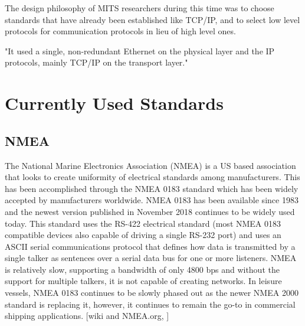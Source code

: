 \documentclass{report}
\begin{document}
The design philosophy of MITS researchers during this time was to choose standards that have already been established like TCP/IP, and to select low level protocols for communication protocols in lieu of high level ones. 

"It used a single, non-redundant Ethernet on the physical layer and the IP protocols, mainly TCP/IP on the transport layer."

\chapter{Currently Used Standards}
\section{NMEA}
The National Marine Electronics Association (NMEA) is a US based association that looks to create uniformity of electrical standards among manufacturers. This has been accomplished through the NMEA 0183 standard which has been widely accepted by manufacturers worldwide. NMEA 0183 has been available since 1983 and the newest version published in November 2018 continues to be widely used today. This standard uses the RS-422 electrical standard (most NMEA 0183 compatible devices also capable of driving a single RS-232 port) and uses an ASCII serial communications protocol that defines how data is transmitted by a single talker as sentences over a serial data bus for one or more listeners. NMEA is relatively slow, supporting a bandwidth of only 4800 bps and without the support for multiple talkers, it is not capable of creating networks. In leisure vessels, NMEA 0183 continues to be slowly phased out as the newer NMEA 2000 standard is replacing it, however, it continues to remain the go-to in commercial shipping applications.
[wiki and NMEA.org, ] 
\end{document}
